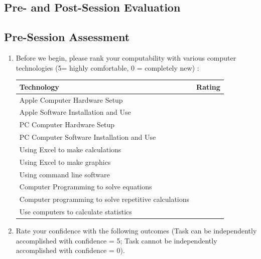 \documentclass{tufte-handout}\usepackage[]{graphicx}\usepackage[]{xcolor}
\begin{document}
\newpage\newpage
\begin{fullwidth}
\section{Pre- and Post-Session Evaluation}

\subsection{Pre-Session Assessment}
\begin{enumerate}
	\item Before we begin, please rank your computability with various computer technologies (5= highly comfortable, 0 = completely new) :
	
\begin{table}
		\begin{tabular}{|l|l|} \toprule
Technology					& Rating \\ \midrule
Apple Computer Hardware Setup 										& \\
Apple Software Installation and Use								& \\
PC Computer Hardware Setup												& \\
PC Computer Software Installation and Use					& \\
Using Excel to make calculations									& \\
Using Excel to make graphics											& \\
Using command line software												& \\
Computer Programming to solve equations						& \\
Computer programming to solve repetitive calculations & \\
Use computers to calculate statistics							& \\
		\bottomrule
		\end{tabular}
\end{table}	
	
	\item Rate your confidence with the following outcomes (Task can be independently accomplished with confidence = 5; Task cannot be independently accomplished with confidence = 0).
	

\end{enumerate}
\end{fullwidth}
\end{document}

